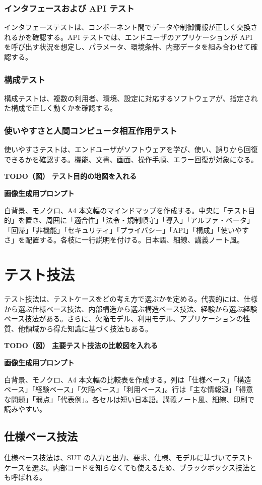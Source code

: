 \documentclass[uplatex,dvipdfmx,a4paper,11pt,nomag]{jsarticle}
\newenvironment{todobox}[2]{\par\medskip\begin{framed}\noindent\textbf{TODO（図） #1}\par\smallskip\noindent\textbf{画像生成用プロンプト}\par\smallskip\noindent #2\par\smallskip}{\end{framed}\par\medskip}
\begin{document}
\subsubsection{インタフェースおよび API テスト}
インタフェーステストは、コンポーネント間でデータや制御情報が正しく交換されるかを確認する。API テストでは、エンドユーザのアプリケーションが API を呼び出す状況を想定し、パラメータ、環境条件、内部データを組み合わせて確認する。

\subsubsection{構成テスト}
構成テストは、複数の利用者、環境、設定に対応するソフトウェアが、指定された構成で正しく動くかを確認する。

\subsubsection{使いやすさと人間コンピュータ相互作用テスト}
使いやすさテストは、エンドユーザがソフトウェアを学び、使い、誤りから回復できるかを確認する。機能、文書、画面、操作手順、エラー回復が対象になる。

\begin{todobox}{テスト目的の地図を入れる}{白背景、モノクロ、A4 本文幅のマインドマップを作成する。中央に「テスト目的」を置き、周囲に「適合性」「法令・規制順守」「導入」「アルファ・ベータ」「回帰」「非機能」「セキュリティ」「プライバシー」「API」「構成」「使いやすさ」を配置する。各枝に一行説明を付ける。日本語、細線、講義ノート風。}
\end{todobox}

\section{テスト技法}
テスト技法は、テストケースをどの考え方で選ぶかを定める。代表的には、仕様から選ぶ仕様ベース技法、内部構造から選ぶ構造ベース技法、経験から選ぶ経験ベース技法がある。さらに、欠陥モデル、利用モデル、アプリケーションの性質、他領域から得た知識に基づく技法もある。

\begin{todobox}{主要テスト技法の比較図を入れる}{白背景、モノクロ、A4 本文幅の比較表を作成する。列は「仕様ベース」「構造ベース」「経験ベース」「欠陥ベース」「利用ベース」。行は「主な情報源」「得意な問題」「弱点」「代表例」。各セルは短い日本語。講義ノート風、細線、印刷で読みやすい。}
\end{todobox}

\subsection{仕様ベース技法}
仕様ベース技法は、SUT の入力と出力、要求、仕様、モデルに基づいてテストケースを選ぶ。内部コードを知らなくても使えるため、ブラックボックス技法とも呼ばれる。
\end{document}
